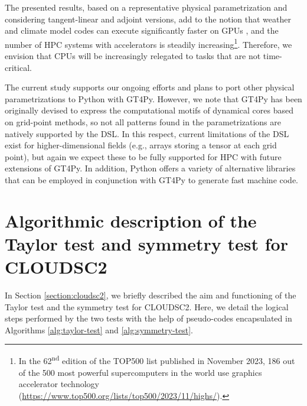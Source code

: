 \documentclass[gmd,manuscript,online]{copernicus}
\begin{document}
	The presented results, based on a representative physical parametrization and considering tangent-linear and adjoint versions, add to the notion that weather and climate model codes can execute significantly faster on GPUs \citep{fuhrer18}, and the number of HPC systems with accelerators is steadily increasing\footnote{In the 62\textsuperscript{nd} edition of the TOP500 list published in November 2023, 186 out of the 500 most powerful supercomputers in the world use graphics accelerator technology (\url{https://www.top500.org/lists/top500/2023/11/highs/}).}. Therefore, we envision that CPUs will be increasingly relegated to tasks that are not time-critical.

	The current study supports our ongoing efforts and plans to port other physical parametrizations to Python with GT4Py. However, we note that GT4Py has been originally devised to express the computational motifs of dynamical cores based on grid-point methods, so not all patterns found in the parametrizations are natively supported by the DSL. In this respect, current limitations of the DSL exist for higher-dimensional fields (e.g., arrays storing a tensor at each grid point), but again we expect these to be fully supported for HPC with future extensions of GT4Py. In addition, Python offers a variety of alternative libraries that can be employed in conjunction with GT4Py to generate fast machine code.

	\appendix

	\section{Algorithmic description of the Taylor test and symmetry test for CLOUDSC2}
	\label{section:appendix}

	In Section \ref{section:cloudsc2}, we briefly described the aim and functioning of the Taylor test and the symmetry test for CLOUDSC2. Here, we detail the logical steps performed by the two tests with the help of pseudo-codes encapsulated in Algorithms \ref{alg:taylor-test} and \ref{alg:symmetry-test}.
\end{document}
